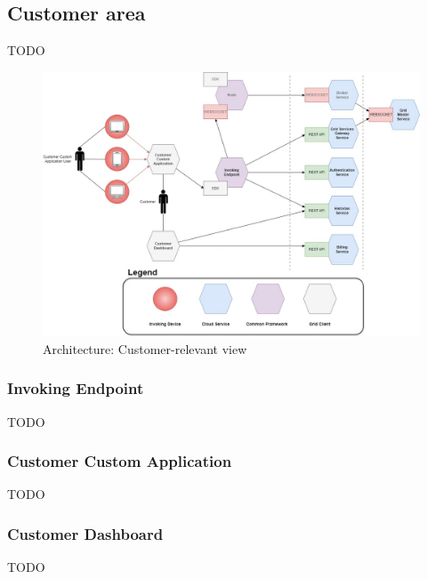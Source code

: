 \subsection{Customer area}\label{customer_area}
TODO
\begin{figure}[!ht]
    \centering
    \includegraphics[width=\linewidth]{document/chapters/chapter_6/images/architecture_customer.jpg}
    \caption{Architecture: Customer-relevant view}
    \label{fig:architecture_customer}
\end{figure}

\subsubsection{Invoking Endpoint}
TODO

\subsubsection{Customer Custom Application}
TODO

\subsubsection{Customer Dashboard}
TODO
